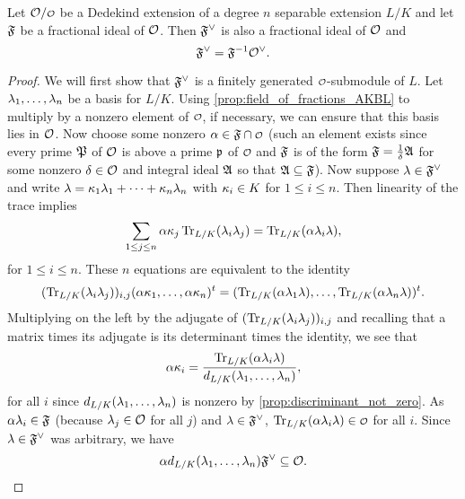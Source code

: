     \begin{proposition}\label{prop:dual_lattice_is_fractional}
      Let $\mc{O}/\smc{O}$ be a Dedekind extension of a degree $n$ separable extension $L/K$ and let $\mathfrak{F}$ be a fractional ideal of $\mathcal{O}$. Then $\mathfrak{F}^{\vee}$ is also a fractional ideal of $\mathcal{O}$ and
      \[
        \mathfrak{F}^{\vee} = \mathfrak{F}^{-1}\mathcal{O}^{\vee}.
      \]
    \end{proposition}
    \begin{proof}
      We will first show that $\mathfrak{F}^{\vee}$ is a finitely generated $\smc{O}$-submodule of $L$. Let $\lambda_{1},\ldots,\lambda_{n}$ be a basis for $L/K$. Using \cref{prop:field_of_fractions_AKBL} to multiply by a nonzero element of $\smc{O}$, if necessary, we can ensure that this basis lies in $\mathcal{O}$. Now choose some nonzero $\a \in \mf{F} \cap \smc{O}$ (such an element exists since every prime $\mathfrak{P}$ of $\mathcal{O}$ is above a prime $\mathfrak{p}$ of $\smc{O}$ and $\mathfrak{F}$ is of the form $\mathfrak{F} = \frac{1}{\delta}\mathfrak{A}$ for some nonzero $\delta \in \mathcal{O}$ and integral ideal $\mathfrak{A}$ so that $\mathfrak{A} \subseteq \mathfrak{F}$). Now suppose $\lambda \in \mathfrak{F}^{\vee}$ and write $\lambda = \kappa_{1}\lambda_{1}+\cdots+\kappa_{n}\lambda_{n}$ with $\kappa_{i} \in K$ for $1 \le i \le n$. Then linearity of the trace implies
      \[
        \sum_{1 \le j \le n}\alpha\kappa_{j}\operatorname{\mathrm{Tr}}_{L/K}(\lambda_{i}\lambda_{j}) = \operatorname{\mathrm{Tr}}_{L/K}(\alpha\lambda_{i}\lambda),
      \]
      for $1 \le i \le n$. These $n$ equations are equivalent to the identity
      \[
        (\operatorname{\mathrm{Tr}}_{L/K}(\lambda_{i}\lambda_{j}))_{i,j}(\alpha\kappa_{1},\ldots,\alpha\kappa_{n})^{t} = (\operatorname{\mathrm{Tr}}_{L/K}(\alpha\lambda_{1}\lambda),\ldots,\operatorname{\mathrm{Tr}}_{L/K}(\alpha\lambda_{n}\lambda))^{t}.
      \]
      Multiplying on the left by the adjugate of $(\operatorname{\mathrm{Tr}}_{L/K}(\lambda_{i}\lambda_{j}))_{i,j}$ and recalling that a matrix times its adjugate is its determinant times the identity, we see that
      \[
        \alpha\kappa_{i} = \frac{\operatorname{\mathrm{Tr}}_{L/K}(\alpha\lambda_{i}\lambda)}{d_{L/K}(\lambda_{1},\ldots,\lambda_{n})},
      \]
      for all $i$ since $d_{L/K}(\lambda_{1},\ldots,\lambda_{n})$ is nonzero by \cref{prop:discriminant_not_zero}. As $\alpha\lambda_{i} \in \mathfrak{F}$ (because $\lambda_{j} \in \mathcal{O}$ for all $j$) and $\lambda \in \mathfrak{F}^{\vee}$, $\Trace_{L/K}(\a\l_{i}\l) \in \smc{O}$ for all $i$. Since $\lambda \in \mathfrak{F}^{\vee}$ was arbitrary, we have
      \[
        \alpha d_{L/K}(\lambda_{1},\ldots,\lambda_{n})\mathfrak{F}^{\vee} \subseteq \mathcal{O}.
      \]

\end{proof}
